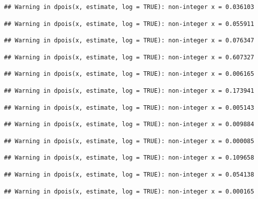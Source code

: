 \documentclass[]{article}
\begin{document}
\begin{verbatim}
## Warning in dpois(x, estimate, log = TRUE): non-integer x = 0.036103
\end{verbatim}

\begin{verbatim}
## Warning in dpois(x, estimate, log = TRUE): non-integer x = 0.055911
\end{verbatim}

\begin{verbatim}
## Warning in dpois(x, estimate, log = TRUE): non-integer x = 0.076347
\end{verbatim}

\begin{verbatim}
## Warning in dpois(x, estimate, log = TRUE): non-integer x = 0.607327
\end{verbatim}

\begin{verbatim}
## Warning in dpois(x, estimate, log = TRUE): non-integer x = 0.006165
\end{verbatim}

\begin{verbatim}
## Warning in dpois(x, estimate, log = TRUE): non-integer x = 0.173941
\end{verbatim}

\begin{verbatim}
## Warning in dpois(x, estimate, log = TRUE): non-integer x = 0.005143
\end{verbatim}

\begin{verbatim}
## Warning in dpois(x, estimate, log = TRUE): non-integer x = 0.009884
\end{verbatim}

\begin{verbatim}
## Warning in dpois(x, estimate, log = TRUE): non-integer x = 0.000085
\end{verbatim}

\begin{verbatim}
## Warning in dpois(x, estimate, log = TRUE): non-integer x = 0.109658
\end{verbatim}

\begin{verbatim}
## Warning in dpois(x, estimate, log = TRUE): non-integer x = 0.054138
\end{verbatim}

\begin{verbatim}
## Warning in dpois(x, estimate, log = TRUE): non-integer x = 0.000165
\end{verbatim}
\end{document}
